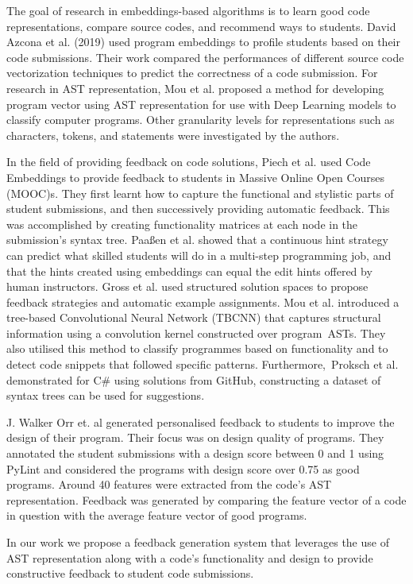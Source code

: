\documentclass[conference]{IEEEtran}
\begin{document}
The goal of research in embeddings-based algorithms is to learn good code representations, compare source codes, and recommend ways to students. David Azcona et al. (2019) \cite{A} used program embeddings to profile students based on their code submissions. Their work compared the performances of different source code vectorization techniques to predict the correctness of a code submission. For research in AST representation, Mou et al. \cite{M} proposed a method for developing program vector using AST representation for use with Deep Learning models to classify computer programs. Other granularity levels for representations such as characters, tokens, and statements were investigated by the authors. 

In the field of providing feedback on code solutions, Piech et al. \cite{N} used Code Embeddings to provide feedback to students in Massive Online Open Courses (MOOC)s. They first learnt how to capture the functional and stylistic parts of student submissions, and then successively providing automatic feedback. This was accomplished by creating functionality matrices at each node in the submission's syntax tree. Paaßen et al. \cite{O} showed that a continuous hint strategy can predict what skilled students will do in a multi-step programming job, and that the hints created using embeddings can equal the edit hints offered by human instructors. Gross et al. \cite{P} used structured solution spaces to propose feedback strategies and automatic example assignments. Mou et al. \cite{Q} introduced a tree-based Convolutional Neural Network (TBCNN) that captures structural information using a convolution kernel constructed over program ASTs. They also utilised this method to classify programmes based on functionality and to detect code snippets that followed specific patterns. Furthermore, Proksch et al. \cite{R} demonstrated for C\# using solutions from GitHub, constructing a dataset of syntax trees can be used for suggestions.

J. Walker Orr et. al \cite{T} generated personalised feedback to students to improve the design of their program. Their focus was on design quality of programs. They annotated the student submissions with a design score between 0 and 1 using PyLint and considered the programs with design score over 0.75 as good programs. Around 40 features were extracted from the code's AST representation. Feedback was generated by comparing the feature vector of a code in question with the average feature vector of good programs.

In our work we propose a feedback generation system that leverages the use of AST representation along with a code's functionality and design to provide constructive feedback to student code submissions. 
\end{document}
